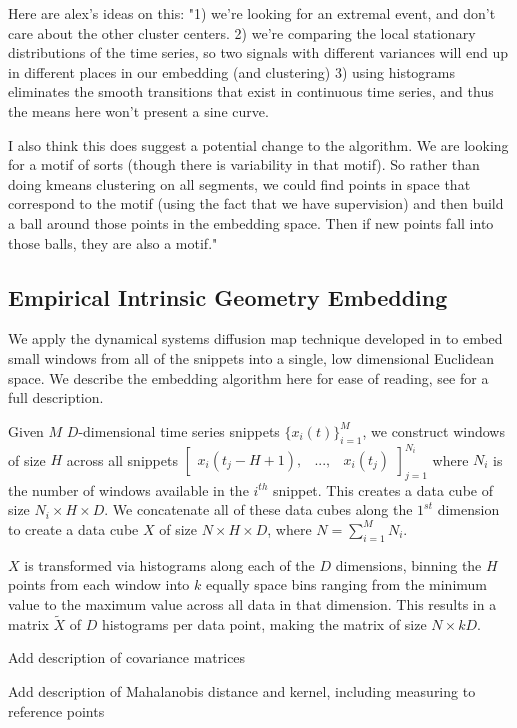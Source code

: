 \documentclass[aps,preprint,superscriptaddress]{revtex4}
\newcommand{\ac}[1]{{\color{red} #1}}
\begin{document}
Here are alex's ideas on this:
"1) we're looking for an extremal event, and don't care about the other cluster centers.  
2) we're comparing the local stationary distributions of the time series, so two signals with different variances will end up in different places in our embedding (and clustering)
3) using histograms eliminates the smooth transitions that exist in continuous time series, and thus the means here won't present a sine curve.  

I also think this does suggest a potential change to the algorithm.   We are looking for a motif of sorts (though there is variability in that motif).  So rather than doing kmeans clustering on all segments, we could find points in space that correspond to the motif (using the fact that we have supervision) and then build a ball around those points in the embedding space.  Then if new points fall into those balls, they are also a motif."
\label{sec:ours}

\subsection{Empirical Intrinsic Geometry Embedding}
We apply the dynamical systems diffusion map technique developed in \cite{} to embed small windows from all of the snippets into a single, low dimensional Euclidean space.    We describe the embedding algorithm here for ease of reading, see \cite{} for a full description.

Given $M$ $D$-dimensional time series snippets $\{x_i(t)\}_{i=1}^M$, we construct windows of size $H$ across all snippets $\begin{bmatrix} x_i(t_j-H+1), & ..., &x_i(t_j)   \end{bmatrix}_{j=1}^{N_i}$ where $N_i$ is the number of windows available in the $i^{th}$ snippet.  This creates a data cube of size $N_i \times H\times D$.  We concatenate all of these data cubes along the $1^{st}$ dimension to create a data cube $X$ of size $N\times H\times D$, where $N=\sum_{i=1}^M N_i$.  

$X$ is transformed via histograms along each of the $D$ dimensions, binning the $H$ points from each window into $k$ equally space bins ranging from the minimum value to the maximum value across all data in that dimension.  This results in a matrix $\widetilde{X}$ of $D$ histograms per data point, making the matrix of size $N\times kD$.  

\ac{Add description of covariance matrices}

\ac{Add description of Mahalanobis distance and kernel, including measuring to reference points}
\end{document}
